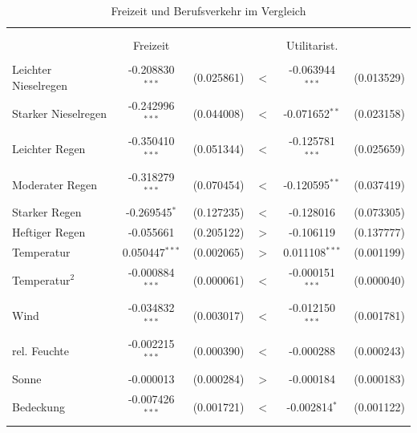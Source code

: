 \documentclass[a4paper,12pt]{thesis}
\begin{document}
\begin{table}[!htbp] \centering 
	\caption{Freizeit und Berufsverkehr im Vergleich} 
	\label{utilitarianvsFreizeit} 
	\begin{tabular}{@{\extracolsep{-5pt}}lccccc} 
		\\[-1.8ex]\hline 
		\hline \\[-1.8ex] 
		\\[-1.8ex] & Freizeit & & & Utilitarist. & \\ 
		\hline \\[-1.8ex] 
		
		Leichter Nieselregen & -0.208830$^{***}$ & (0.025861) & $<$ & -0.063944$^{***}$ & (0.013529)\\ 
		
		Starker Nieselregen & -0.242996$^{***}$ & (0.044008) & $<$ & -0.071652$^{**}$ & (0.023158)\\ 
		
		Leichter Regen & -0.350410$^{***}$ & (0.051344) & $<$ & -0.125781$^{***}$ & (0.025659)\\ 
		
		Moderater Regen & -0.318279$^{***}$ & (0.070454) & $<$ & -0.120595$^{**}$ & (0.037419)\\ 
		
		Starker Regen & -0.269545$^{*}$ & (0.127235) & $<$ & -0.128016 & (0.073305)\\ 
		
		Heftiger Regen & -0.055661 & (0.205122) & $>$ & -0.106119 & (0.137777)\\ 
		
		Temperatur & 0.050447$^{***}$ & (0.002065) & $>$ & 0.011108$^{***}$ & (0.001199)\\ 
		
		Temperatur$^2$ & -0.000884$^{***}$ & (0.000061) & $<$ & -0.000151$^{***}$ & (0.000040)\\ 
		
		Wind & -0.034832$^{***}$ & (0.003017) & $<$ & -0.012150$^{***}$ & (0.001781)\\ 
		
		rel. Feuchte & -0.002215$^{***}$ & (0.000390) & $<$ & -0.000288 & (0.000243)\\ 
		
		Sonne & -0.000013 & (0.000284) & $>$ & -0.000184 & (0.000183)\\ 
		
		Bedeckung & -0.007426$^{***}$ & (0.001721) & $<$ & -0.002814$^{*}$ & (0.001122)\\ 
		

\end{tabular}
\end{table}
\end{document}
